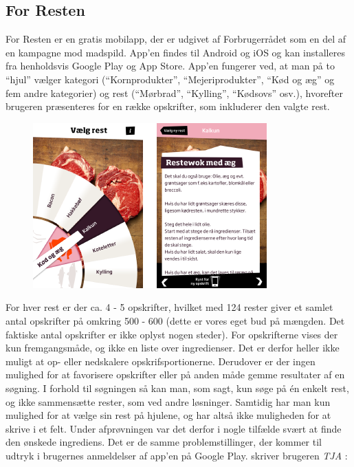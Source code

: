 \subsection{For Resten}
\label{subsec:forresten}

For Resten er en gratis mobilapp, der er udgivet af Forbrugerrådet som en del af en kampagne mod madspild. App’en findes til Android og iOS og kan installeres fra henholdsvis Google Play og App Store. App’en fungerer ved, at man på to ``hjul'' vælger kategori (``Kornprodukter'', ``Mejeriprodukter'', ``Kød og æg'' og fem andre kategorier) og rest (\fx ``Mørbrad'', ``Kylling'', ``Kødsovs'' osv.), hvorefter brugeren præsenteres for en række opskrifter, som inkluderer den valgte rest.

\begin{figure}[H]
\centering
\includegraphics[scale=0.7]{billeder/forbilleder/forresten.png}
\label{fig:forresten}
\end{figure}

For hver rest er der ca. 4 - 5 opskrifter, hvilket med 124 rester giver et samlet antal opskrifter på omkring 500 - 600 (dette er vores eget bud på mængden. Det faktiske antal opskrifter er ikke oplyst nogen steder). For opskrifterne vises der kun fremgangsmåde, og ikke en liste over ingredienser. Det er derfor heller ikke muligt at op- eller nedskalere opskrifsportionerne. Derudover er der ingen mulighed for at favorisere opskrifter eller på anden måde gemme resultater af en søgning. I forhold til søgningen så kan man, som sagt, kun søge på én enkelt rest, og ikke sammensætte rester, som ved andre løsninger. Samtidig har man kun mulighed for at vælge sin rest på hjulene, og har altså ikke muligheden for at skrive i et felt. Under afprøvningen var det derfor i nogle tilfælde svært at finde den ønskede ingrediens. Det er de samme problemstillinger, der kommer til udtryk i brugernes anmeldelser af app’en på Google Play. \Fx skriver brugeren \textit{TJA} \cite{tja}:

